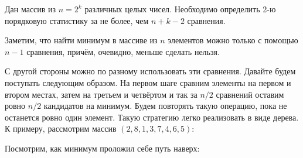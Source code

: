 \documentclass[addpoints]{exam}
\begin{document}
\begin{questions}
\question[1 \half] Дан массив из $n = 2^k$ различных целых чисел. Необходимо определить 2-ю порядковую статистику за не более, чем $n + k - 2$ сравнения.

\begin{solution}


Заметим, что найти минимум в массиве из $n$ элементов можно только с помощью $n-1$ сравнения, причём, очевидно, меньше сделать нельзя.

С другой стороны можно по разному использовать эти сравнения. Давайте будем поступать следующим образом. На первом шаге сравним элементы на первом и втором местах, затем на третьем и четвёртом и так за $n/2$ сравнений оставим ровно $n/2$ кандидатов на минимум. Будем повторять такую операцию, пока не останется ровно один элемент. Такую стратегию легко реализовать в виде дерева. К примеру, рассмотрим массив $(2,8,1,3,7,4,6,5)$:

\begin{center}
\end{center}

Посмотрим, как минимум проложил себе путь наверх:


\end{solution}
\end{questions}
\end{document}
